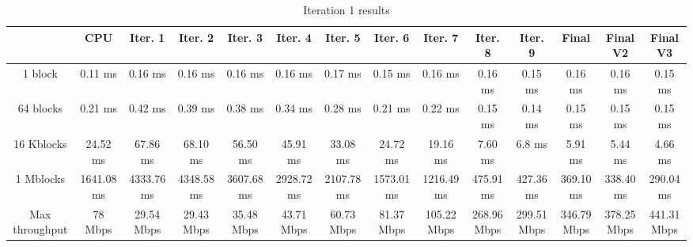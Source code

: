 \begin{table}
	\caption{Iteration 1 results}
	\centering
	\begin{tabular}{cccccccccccccc}
		\toprule
		 & CPU & Iter. 1 & Iter. 2 & Iter. 3 & Iter. 4 & Iter. 5 & Iter. 6 & Iter. 7 & Iter. 8 & Iter. 9 & Final & Final V2 & Final V3 \\
		\midrule
		1 block & 0.11 ms & 0.16 ms & 0.16 ms & 0.16 ms & 0.16 ms & 0.17 ms & 0.15 ms & 0.16 ms & 0.16 ms & 0.15 ms & 0.16 ms & 0.16 ms & 0.15 ms \\
		64 blocks & 0.21 ms & 0.42 ms & 0.39 ms & 0.38 ms & 0.34 ms & 0.28 ms & 0.21 ms & 0.22 ms & 0.15 ms & 0.14 ms & 0.15 ms & 0.15 ms & 0.15 ms \\
		16 Kblocks & 24.52 ms & 67.86 ms & 68.10 ms & 56.50 ms & 45.91 ms & 33.08 ms & 24.72 ms & 19.16 ms & 7.60 ms & 6.8 ms & 5.91 ms & 5.44 ms & 4.66 ms \\
		1 Mblocks & 1641.08 ms & 4333.76 ms & 4348.58 ms & 3607.68 ms & 2928.72 ms & 2107.78 ms & 1573.01 ms & 1216.49 ms & 475.91 ms & 427.36 ms & 369.10 ms & 338.40 ms & 290.04 ms \\
		Max throughput & 78 Mbps & 29.54 Mbps & 29.43 Mbps & 35.48 Mbps & 43.71 Mbps & 60.73 Mbps & 81.37 Mbps & 105.22 Mbps & 268.96 Mbps & 299.51 Mbps & 346.79 Mbps & 378.25 Mbps & 441.31 Mbps \\
		\bottomrule
	\end{tabular}
\end{table}
